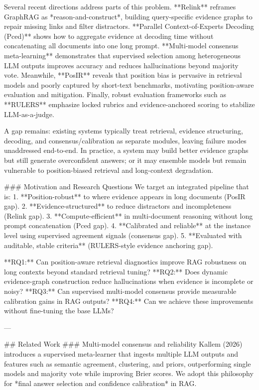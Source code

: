 Several recent directions address parts of this problem. **Relink** reframes GraphRAG as *reason-and-construct*, building query-specific evidence graphs to repair missing links and filter distractors. **Parallel Context-of-Experts Decoding (Pced)** shows how to aggregate evidence at decoding time without concatenating all documents into one long prompt. **Multi-model consensus meta-learning** demonstrates that supervised selection among heterogeneous LLM outputs improves accuracy and reduces hallucinations beyond majority vote. Meanwhile, **PosIR** reveals that position bias is pervasive in retrieval models and poorly captured by short-text benchmarks, motivating position-aware evaluation and mitigation. Finally, robust evaluation frameworks such as **RULERS** emphasize locked rubrics and evidence-anchored scoring to stabilize LLM-as-a-judge.

A gap remains: existing systems typically treat retrieval, evidence structuring, decoding, and consensus/calibration as separate modules, leaving failure modes unaddressed end-to-end. In practice, a system may build better evidence graphs but still generate overconfident answers; or it may ensemble models but remain vulnerable to position-biased retrieval and long-context degradation.

### Motivation and Research Questions  
We target an integrated pipeline that is:  
1. **Position-robust** to where evidence appears in long documents (PosIR gap).  
2. **Evidence-structured** to reduce distractors and incompleteness (Relink gap).  
3. **Compute-efficient** in multi-document reasoning without long prompt concatenation (Pced gap).  
4. **Calibrated and reliable** at the instance level using supervised agreement signals (consensus gap).  
5. **Evaluated with auditable, stable criteria** (RULERS-style evidence anchoring gap).

**RQ1:** Can position-aware retrieval diagnostics improve RAG robustness on long contexts beyond standard retrieval tuning?  
**RQ2:** Does dynamic evidence-graph construction reduce hallucinations when evidence is incomplete or noisy?  
**RQ3:** Can supervised multi-model consensus provide measurable calibration gains in RAG outputs?  
**RQ4:** Can we achieve these improvements without fine-tuning the base LLMs?

---

## Related Work  
### Multi-model consensus and reliability  
Kallem (2026) introduces a supervised meta-learner that ingests multiple LLM outputs and features such as semantic agreement, clustering, and priors, outperforming single models and majority vote while improving Brier scores. We adopt this philosophy for *final answer selection and confidence calibration* in RAG.

